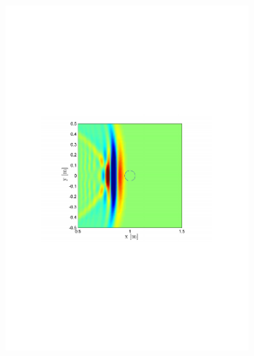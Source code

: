 \begin{figure}
        \centering
        \begin{subfigure}[b]{0.48\textwidth}
                \centering
                \includegraphics[width=\textwidth]{images/02_Konzeptionierung/sim_wave_3000_1}
        \end{subfigure}
        ~ %
        \begin{subfigure}[b]{0.48\textwidth}
                \centering

\end{subfigure}
\end{figure}
